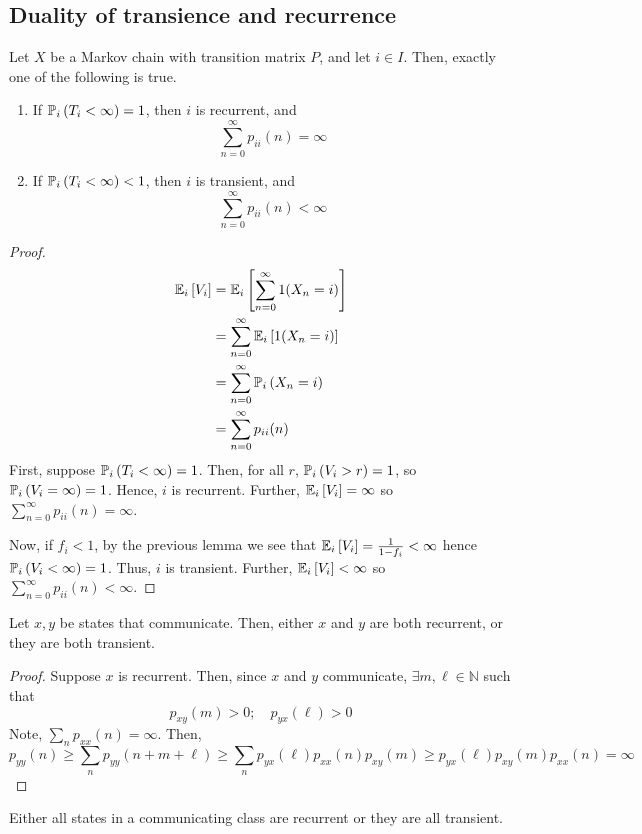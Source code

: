 \subsection{Duality of transience and recurrence}
\begin{theorem}
	Let \( X \) be a Markov chain with transition matrix \( P \), and let \( i \in I \).
	Then, exactly one of the following is true.
	\begin{enumerate}
		\item If \( \mathbb{P}_{i}\left({T_i < \infty}\right) = 1 \), then \( i \) is recurrent, and
		      \[
			      \sum_{n=0}^\infty p_{ii}(n) = \infty
		      \]
		\item If \( \mathbb{P}_{i}\left({T_i < \infty}\right) < 1 \), then \( i \) is transient, and
		      \[
			      \sum_{n=0}^\infty p_{ii}(n) < \infty
		      \]
	\end{enumerate}
\end{theorem}
\begin{proof}
	\begin{align*}
		\mathbb{E}_{i}\left[{V_i}\right] & = \mathbb{E}_{i}\left[{\sum_{n=0}^\infty 1(X_n = i)}\right] \\
		              & = \sum_{n=0}^\infty \mathbb{E}_{i}\left[{1(X_n = i)}\right] \\
		              & = \sum_{n=0}^\infty \mathbb{P}_{i}\left({X_n = i}\right)    \\
		              & = \sum_{n=0}^\infty p_{ii}(n)
	\end{align*}
	First, suppose \( \mathbb{P}_{i}\left({T_i < \infty}\right) = 1 \).
	Then, for all \( r \), \( \mathbb{P}_{i}\left({V_i > r}\right) = 1 \), so \( \mathbb{P}_{i}\left({V_i = \infty}\right) = 1 \).
	Hence, \( i \) is recurrent.
	Further, \( \mathbb{E}_{i}\left[{V_i}\right] = \infty \) so \( \sum_{n=0}^\infty p_{ii}(n) = \infty \).

	Now, if \( f_i < 1 \), by the previous lemma we see that \( \mathbb{E}_{i}\left[{V_i}\right] = \frac{1}{1-f_i} < \infty \) hence \( \mathbb{P}_{i}\left({V_i < \infty}\right) = 1 \).
	Thus, \( i \) is transient.
	Further, \( \mathbb{E}_{i}\left[{V_i}\right] < \infty \) so \( \sum_{n=0}^\infty p_{ii}(n) < \infty \).
\end{proof}
\begin{theorem}
	Let \( x, y \) be states that communicate.
	Then, either \( x \) and \( y \) are both recurrent, or they are both transient.
\end{theorem}
\begin{proof}
	Suppose \( x \) is recurrent.
	Then, since \( x \) and \( y \) communicate, \( \exists m, \ell \in \mathbb N \) such that
	\[
		p_{xy}(m) > 0;\quad p_{yx}(\ell) > 0
	\]
	Note, \( \sum_n p_{xx}(n) = \infty \).
	Then,
	\[
		p_{yy}(n) \geq \sum_n p_{yy}(n+m+\ell) \geq \sum_n p_{yx}(\ell) p_{xx}(n) p_{xy}(m) \geq p_{yx}(\ell) p_{xy}(m) p_{xx}(n) = \infty
	\]
\end{proof}
\begin{corollary}
	Either all states in a communicating class are recurrent or they are all transient.
\end{corollary}


